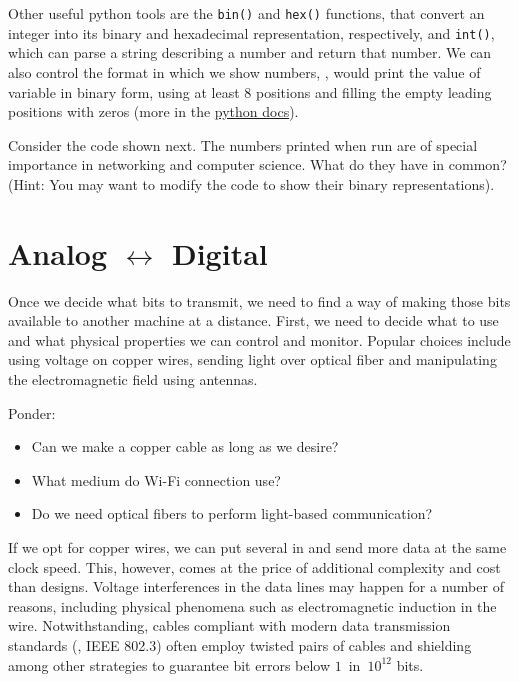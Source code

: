 Other useful python tools are the \texttt{bin()} and \texttt{hex()} functions, that convert an integer 
into its binary and hexadecimal representation, respectively, and \texttt{int()}, which can parse
a string describing a number and return that number. We can also control the format in which we show numbers,
\eg,  would print the value of variable  in binary form, 
using at least 8 positions and filling the empty leading positions with zeros
(more in the \href{https://docs.python.org/3/reference/lexical_analysis.html#f-strings}{python docs}).

\begin{exercise}
Consider the code shown next. The numbers printed when run are of special importance in networking and computer science.
What do they have in common? (Hint: You may want to modify the code to show their binary representations).

\begin{center}
\end{center}
\label{ex:bitwisemanipulation}
\end{exercise}

\section{Analog $\leftrightarrow$ Digital}\label{sec:piercing:analog_digital}

Once we decide what bits to transmit, we need to find a way of making those bits available to another machine at a distance.
First, we need to decide what  to use and what physical properties we can control and monitor.
Popular choices include using voltage on copper wires, sending light over optical fiber and manipulating the 
electromagnetic field using antennas.

\begin{exercise} Ponder:\\[-0.5cm]
\begin{itemize}
\item Can we make a copper cable as long as we desire?
\item What medium do Wi-Fi connection use? 
\item Do we need optical fibers to perform light-based communication?
\end{itemize}
\end{exercise}


If we opt for copper wires, we can put several in  and send more data at the same clock speed.
This, however, comes at the price of additional complexity and cost than  designs. 
Voltage interferences in the data lines may happen for a number of reasons, 
including physical phenomena such as electromagnetic induction in the wire. 
Notwithstanding, cables compliant with modern data transmission standards (\eg, IEEE 802.3)
often employ twisted pairs of cables and shielding
among other strategies to guarantee bit errors below $1$~in~$10^{12}$ bits.

